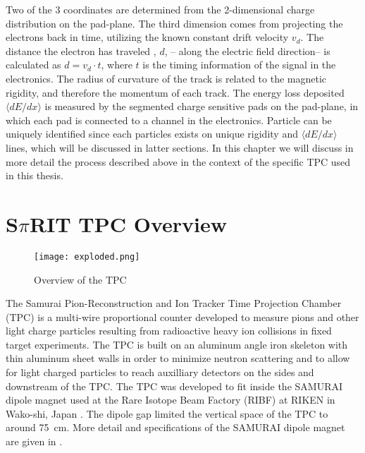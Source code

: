 Two of the 3 coordinates are determined from the 2-dimensional charge distribution on the pad-plane. The third dimension comes from projecting the electrons back in time, utilizing the known constant drift velocity $v_d$. The distance the electron has traveled , $d$, -- along the electric field direction-- is calculated as $d = v_d \cdot t$, where $t$ is the timing information of the signal in the electronics. The radius of curvature of the track is related to the magnetic rigidity, and therefore the momentum of each track. The energy loss deposited $\langle dE/dx\rangle$ is measured by the segmented charge sensitive pads on the pad-plane, in which each pad is connected to a channel in the electronics. Particle can be uniquely identified since  each particles exists on unique rigidity and $\langle dE/dx\rangle$  lines, which will be discussed in latter sections. In this chapter we will discuss in more detail the process described above in the context of the specific TPC used in this thesis. 

\section{S$\pi$RIT TPC Overview}

\begin{figure}[!htb]
\texttt{[image: exploded.png]}
\caption{Overview of the \spirit TPC}
\label{fig:tpcExplode}
\end{figure}


The Samurai Pion-Reconstruction and Ion Tracker Time Projection Chamber (\spirit TPC) is a multi-wire proportional counter developed to measure pions and other light charge particles resulting from radioactive heavy ion collisions in fixed target experiments.  The TPC is built on an aluminum angle iron skeleton with thin aluminum sheet walls in order to minimize neutron scattering and to allow for light charged particles to reach auxilliary detectors on the sides and downstream of the TPC. The \spirit TPC was developed to fit inside the SAMURAI dipole magnet used at the Rare Isotope Beam Factory (RIBF) at RIKEN in Wako-shi, Japan \cite{riken}. The dipole gap limited the vertical space of the TPC to around \SI{75}{\centi\metre}. More detail and specifications of the SAMURAI dipole magnet are given in \cite{samurai}. 

